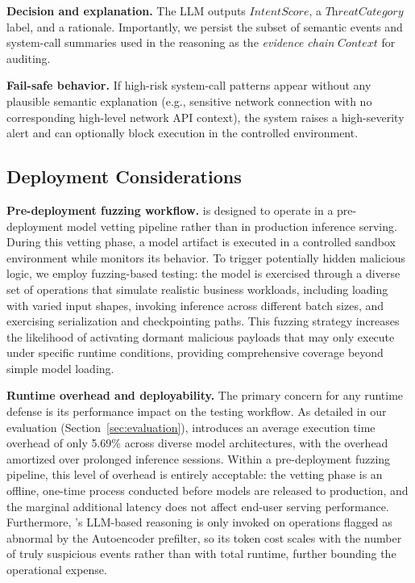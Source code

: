 \noindent \textbf{Decision and explanation.} The LLM outputs $\textit{IntentScore}$, a $\textit{ThreatCategory}$ label, and a rationale. Importantly, we persist the subset of semantic events and system-call summaries used in the reasoning as the \emph{evidence chain} $\textit{Context}$ for auditing.

\noindent \textbf{Fail-safe behavior.} If high-risk system-call patterns appear without any plausible semantic explanation (e.g., sensitive network connection with no corresponding high-level network API context), the system raises a high-severity alert and can optionally block execution in the controlled environment.

\subsection{Deployment Considerations}

\noindent \textbf{Pre-deployment fuzzing workflow.} \toolname{} is designed to operate in a pre-deployment model vetting pipeline rather than in production inference serving. During this vetting phase, a model artifact is executed in a controlled sandbox environment while \toolname{} monitors its behavior. To trigger potentially hidden malicious logic, we employ fuzzing-based testing\cite{}: the model is exercised through a diverse set of operations that simulate realistic business workloads, including loading with varied input shapes, invoking inference across different batch sizes, and exercising serialization and checkpointing paths. This fuzzing strategy increases the likelihood of activating dormant malicious payloads that may only execute under specific runtime conditions, providing comprehensive coverage beyond simple model loading.

\noindent \textbf{Runtime overhead and deployability.} The primary concern for any runtime defense is its performance impact on the testing workflow. As detailed in our evaluation (Section~\ref{sec:evaluation}), \toolname{} introduces an average execution time overhead of only 5.69\% across diverse model architectures, with the overhead amortized over prolonged inference sessions. Within a pre-deployment fuzzing pipeline, this level of overhead is entirely acceptable: the vetting phase is an offline, one-time process conducted before models are released to production, and the marginal additional latency does not affect end-user serving performance. Furthermore, \toolname{}'s LLM-based reasoning is only invoked on operations flagged as abnormal by the Autoencoder prefilter, so its token cost scales with the number of truly suspicious events rather than with total runtime, further bounding the operational expense.
